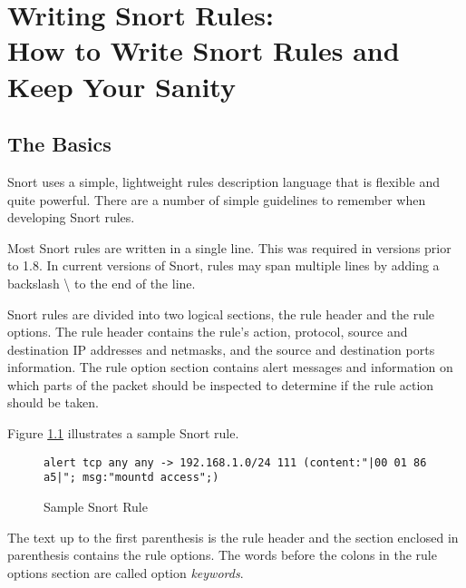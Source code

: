\documentclass[english]{report}
\begin{document}

\clearpage
\chapter{Writing Snort Rules: \protect \\
How to Write Snort Rules and Keep Your Sanity\label{Writing Snort Rules}}

\section{The Basics}

Snort uses a simple, lightweight rules description language that is flexible
and quite powerful. There are a number of simple guidelines to remember when
developing Snort rules.

Most Snort rules are written in a single line. This was required in versions
prior to 1.8. In current versions of Snort, rules may span multiple lines by
adding a backslash \textbackslash{} to the end of the line. 

Snort rules are divided into two logical sections, the rule header and the rule
options. The rule header contains the rule's action, protocol, source and
destination IP addresses and netmasks, and the source and destination ports
information. The rule option section contains alert messages and information on
which parts of the packet should be inspected to determine if the rule action
should be taken.

Figure \ref{Sample Snort Rule} illustrates a sample Snort rule.

\begin{center}
\begin{figure}[!hbpt]
\begin{verbatim}
alert tcp any any -> 192.168.1.0/24 111 (content:"|00 01 86 a5|"; msg:"mountd access";)
\end{verbatim}

\caption{Sample Snort Rule\label{Sample Snort Rule}}
\end{figure}
\end{center}

The text up to the first parenthesis is the rule header and the section
enclosed in parenthesis contains the rule options. The words before the
colons in the rule options section are called option \emph{keywords}. 
\end{document}
